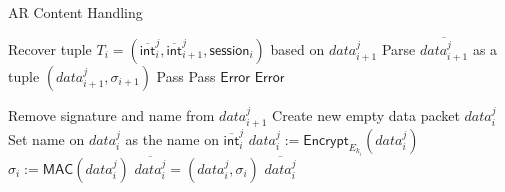 \begin{algorithm}[ht!]
  \caption{AR Content Handling}
  \begin{algorithmic}[1]
\State Recover tuple $T_i = (\overline{\mathsf{int}}_{i}^{j}, \overline{\mathsf{int}}_{i+1}^{j}, \mathsf{session}_i)$ based on $data_{i+1}^j$
\State Parse $\overline{data_{i+1}^j}$ as a tuple $(data_{i+1}^j, \sigma_{i+1})$
  \State Pass
    \State Pass
  \Else
    \State \Return $\mathsf{Error}$ %
  \EndIf
\Else %
  \State \Return $\mathsf{Error}$
\EndIf

\State Remove signature and name from $data_{i+1}^j$    
\State Create new empty data packet $data_i^j$
\State Set name on $data_i^j$ as the name on $\overline{\mathsf{int}}_{i}^{j}$
\State $data_i^j := \mathsf{Encrypt}_{E_{k_i}}(data_i^j)$
\State $\sigma_i := \mathsf{MAC}(data_i^j)$
\State $\overline{data_{i}^j} = (data_i^j, \sigma_i)$
\State \Return $\overline{data_{i}^j}$

\end{algorithmic}
\label{alg:ar_content_handler}
\end{algorithm}


